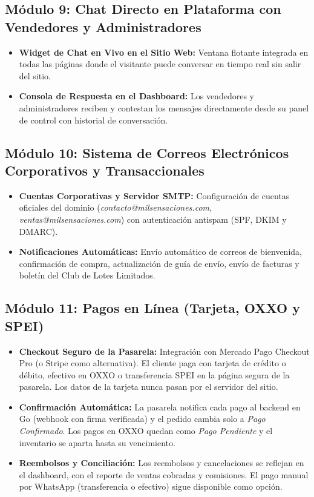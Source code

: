\documentclass[11pt,letterpaper]{article}
\begin{document}
\subsection{Módulo 9: Chat Directo en Plataforma con Vendedores y Administradores}
\begin{itemize}[leftmargin=1.5cm]
    \item \textbf{Widget de Chat en Vivo en el Sitio Web:} Ventana flotante integrada en todas las páginas donde el visitante puede conversar en tiempo real sin salir del sitio.
    \item \textbf{Consola de Respuesta en el Dashboard:} Los vendedores y administradores reciben y contestan los mensajes directamente desde su panel de control con historial de conversación.
\end{itemize}

\subsection{Módulo 10: Sistema de Correos Electrónicos Corporativos y Transaccionales}
\begin{itemize}[leftmargin=1.5cm]
    \item \textbf{Cuentas Corporativas y Servidor SMTP:} Configuración de cuentas oficiales del dominio (\textit{contacto@milsensaciones.com}, \textit{ventas@milsensaciones.com}) con autenticación antispam (SPF, DKIM y DMARC).
    \item \textbf{Notificaciones Automáticas:} Envío automático de correos de bienvenida, confirmación de compra, actualización de guía de envío, envío de facturas y boletín del Club de Lotes Limitados.
\end{itemize}

\subsection{Módulo 11: Pagos en Línea (Tarjeta, OXXO y SPEI)}
\begin{itemize}[leftmargin=1.5cm]
    \item \textbf{Checkout Seguro de la Pasarela:} Integración con Mercado Pago Checkout Pro (o Stripe como alternativa). El cliente paga con tarjeta de crédito o débito, efectivo en OXXO o transferencia SPEI en la página segura de la pasarela. Los datos de la tarjeta nunca pasan por el servidor del sitio.
    \item \textbf{Confirmación Automática:} La pasarela notifica cada pago al backend en Go (webhook con firma verificada) y el pedido cambia solo a \textit{Pago Confirmado}. Los pagos en OXXO quedan como \textit{Pago Pendiente} y el inventario se aparta hasta su vencimiento.
    \item \textbf{Reembolsos y Conciliación:} Los reembolsos y cancelaciones se reflejan en el dashboard, con el reporte de ventas cobradas y comisiones. El pago manual por WhatsApp (transferencia o efectivo) sigue disponible como opción.
\end{itemize}
\end{document}
